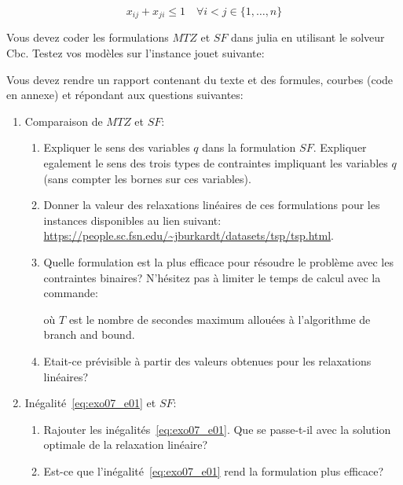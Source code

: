 \begin{td-exo}
	\begin{equation}\label{eq:exo07_e01}
		x_{ij} + x_{ji} \leq 1 \quad \forall i < j \in \{1, \ldots, n\}
	\end{equation}

	Vous devez coder les formulations \(MTZ\) et \(SF\) dans julia en utilisant le solveur Cbc.
	Testez vos modèles sur l'instance jouet suivante:

	Vous devez rendre un rapport contenant du texte et des formules, courbes (code en annexe) et répondant aux questions suivantes:
	
	\begin{enumerate}
		\item Comparaison de \(MTZ\) et \(SF\):
		
		\begin{enumerate}
			\item Expliquer le sens des variables \(q\) dans la formulation \(SF\).
			Expliquer egalement le sens des trois types de contraintes impliquant les variables \(q\) (sans compter les bornes sur ces variables).

			\item Donner la valeur des relaxations linéaires de ces formulations pour les instances disponibles au lien suivant:
			\url{https://people.sc.fsn.edu/\~jburkardt/datasets/tsp/tsp.html}.

			\item Quelle formulation est la plus efficace pour résoudre le problème avec les contraintes binaires?
			N'hésitez pas à limiter le temps de calcul avec la commande:
			
			
			où \(T\) est le nombre de secondes maximum allouées à l'algorithme de branch and bound.

			\item Etait-ce prévisible à partir des valeurs obtenues pour les relaxations linéaires?
		\end{enumerate}

		\item Inégalité~\eqref{eq:exo07_e01} et \(SF\):

		\begin{enumerate}
			\item Rajouter les inégalités~\eqref{eq:exo07_e01}.
			Que se passe-t-il avec la solution optimale de la relaxation linéaire?

			\item Est-ce que l'inégalité~\eqref{eq:exo07_e01} rend la formulation plus efficace?


\end{enumerate}
\end{enumerate}
\end{td-exo}
